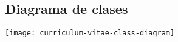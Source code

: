 \latexhtml{\begin{landscape}}{}
  \subsection{Diagrama de clases}
    \texttt{[image: curriculum-vitae-class-diagram]}
\latexhtml{\end{landscape}}{}
